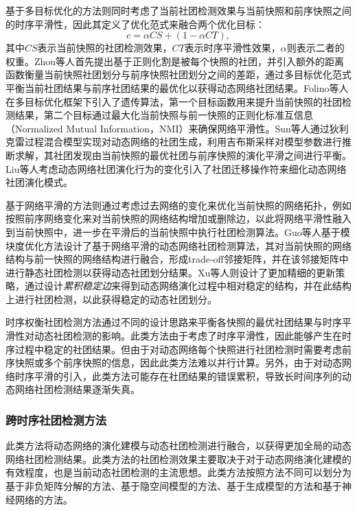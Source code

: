 基于多目标优化的方法则同时考虑了当前社团检测效果与当前快照和前序快照之间的时序平滑性，因此其定义了优化范式来融合两个优化目标：
\begin{equation}
c=\alpha CS+(1-\alpha CT),
\end{equation}
其中$CS$表示当前快照的社团检测效果，$CT$表示时序平滑性效果，$\alpha$则表示二者的权重。Zhou等人\cite{zhou2007discovering}首先提出基于正则化割是被每个快照的社团，并引入额外的距离函数衡量当前快照社团划分与前序快照社团划分之间的差距，通过多目标优化范式平衡当前社团结果与前序社团结果的最优化以获得动态网络社团结果。Folino等人\cite{folino2013evolutionary}在多目标优化框架下引入了遗传算法，第一个目标函数用来提升当前快照的社团检测结果，第二个目标通过最大化当前快照与前一快照的正则化标准互信息（Normalized Mutual Information，NMI）来确保网络平滑性。Sun等人\cite{sun2013co}通过狄利克雷过程混合模型实现对动态网络的社团生成，利用吉布斯采样对模型参数进行推断求解，其社团发现由当前快照的最优社团与前序快照的演化平滑之间进行平衡。Liu等人\cite{liu2020detecting}考虑动态网络社团演化行为的变化引入了社团迁移操作符来细化动态网络社团演化模式。

基于网络平滑的方法则通过考虑过去网络的变化来优化当前快照的网络拓扑，例如按照前序网络变化来对当前快照的网络结构增加或删除边，以此将网络平滑性融入到当前快照中，进一步在平滑后的当前快照中执行社团检测算法。Guo等人\cite{guo2014evolutionary}基于模块度优化方法设计了基于网络平滑的动态网络社团检测算法，其对当前快照的网络结构与前一快照的网络结构进行融合，形成trade-off邻接矩阵，并在该邻接矩阵中进行静态社团检测以获得动态社团划分结果。Xu等人\cite{xu2013community}则设计了更加精细的更新策略，通过设计\textit{累积稳定边}来得到动态网络演化过程中相对稳定的结构，并在此结构上进行社团检测，以此获得稳定的动态社团划分。

时序权衡社团检测方法通过不同的设计思路来平衡各快照的最优社团结果与时序平滑性对动态社团检测的影响。此类方法由于考虑了时序平滑性，因此能够产生在时序过程中稳定的社团结果。但由于对动态网络每个快照进行社团检测时需要考虑前序快照或多个前序快照的信息，因此此类方法难以并行计算。另外，由于对动态网络时序平滑的引入，此类方法可能存在社团结果的错误累积，导致长时间序列的动态网络社团检测结果逐渐失真。

\subsubsection{跨时序社团检测方法}
此类方法将动态网络的演化建模与动态社团检测进行融合，以获得更加全局的动态网络社团检测结果。此类方法的社团检测效果主要取决于对于动态网络演化建模的有效程度，也是当前动态社团检测的主流思想。此类方法按照方法不同可以划分为基于非负矩阵分解的方法、基于隐空间模型的方法、基于生成模型的方法和基于神经网络的方法。

